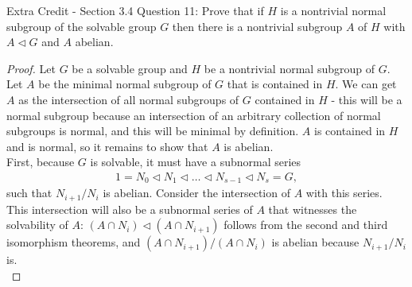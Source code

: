 Extra Credit - Section 3.4 Question 11: Prove that if $H$ is a
nontrivial normal subgroup of the solvable group $G$ then there is a
nontrivial subgroup $A$ of $H$ with $A\triangleleft G$ and $A$ abelian.

\begin{proof}
  Let $G$ be a solvable group and $H$ be a nontrivial normal subgroup of
  $G$. Let $A$ be the minimal normal subgroup of $G$ that is contained in
  $H$. We can get $A$ as the intersection of all normal subgroups of $G$
  contained in $H$ - this will be a normal subgroup because an intersection
  of an arbitrary collection of normal subgroups is normal, and this will
  be minimal by definition. $A$ is contained in $H$ and is normal, so it
  remains to show that $A$ is abelian. \\

  First, because $G$ is solvable, it must have a subnormal series
  \begin{align*}
    1=N_0 \triangleleft N_1\triangleleft\ldots\triangleleft
    N_{s-1}\triangleleft N_s=G,
  \end{align*}
  such that $N_{i+1}/N_i$ is abelian. Consider the intersection of $A$ with
  this series. This intersection will also be a subnormal
  series of $A$ that witnesses the solvability of $A$: $(A\cap
  N_i)\triangleleft(A\cap N_{i+1})$ follows from the second and third
  isomorphism theorems, and $(A\cap N_{i+1})/(A\cap N_i)$ is abelian because
  $N_{i+1}/N_i$ is. \\


\end{proof}
